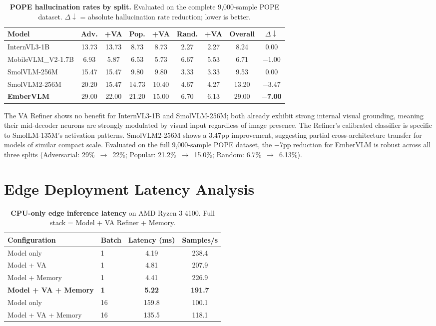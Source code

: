 \begin{table}[htbp]
\centering
\caption{\textbf{POPE hallucination rates by split.} Evaluated on the complete 9{,}000-sample POPE dataset. $\Delta\downarrow$ = absolute hallucination rate reduction; lower is better.}
\label{tab:pope_results}
\scriptsize
\setlength{\tabcolsep}{3pt}
\begin{tabular}{lcc|cc|cc|cc}
\toprule
\textbf{Model} & Adv. & +VA & Pop. & +VA & Rand. & +VA & Overall & $\Delta\downarrow$ \\
\midrule
InternVL3-1B       & 13.73 & 13.73 & 8.73  & 8.73  & 2.27 & 2.27 & 8.24  & 0.00 \\
MobileVLM\_V2-1.7B & 6.93  & 5.87  & 6.53  & 5.73  & 6.67 & 5.53 & 6.71  & $-$1.00 \\
SmolVLM-256M       & 15.47 & 15.47 & 9.80  & 9.80  & 3.33 & 3.33 & 9.53  & 0.00 \\
SmolVLM2-256M      & 20.20 & 15.47 & 14.73 & 10.40 & 4.67 & 4.27 & 13.20 & $-$3.47 \\
\textbf{EmberVLM}  & 29.00 & 22.00 & 21.20 & 15.00 & 6.70 & 6.13 & 29.00 & \textbf{$-$7.00} \\
\bottomrule
\end{tabular}
\end{table}

The VA Refiner shows no benefit for InternVL3-1B and SmolVLM-256M; both already exhibit strong internal visual grounding, meaning their mid-decoder neurons are strongly modulated by visual input regardless of image presence. The Refiner's calibrated classifier is specific to SmolLM-135M's activation patterns. SmolVLM2-256M shows a 3.47pp improvement, suggesting partial cross-architecture transfer for models of similar compact scale. Evaluated on the full 9{,}000-sample POPE dataset, the $-$7pp reduction for EmberVLM is robust across all three splits (Adversarial: 29\%~$\rightarrow$~22\%; Popular: 21.2\%~$\rightarrow$~15.0\%; Random: 6.7\%~$\rightarrow$~6.13\%).

\section{Edge Deployment Latency Analysis}
\label{sec:exp_latency}

\begin{table}[htbp]
\centering
\caption{\textbf{CPU-only edge inference latency} on AMD Ryzen 3 4100. Full stack = Model + VA Refiner + Memory.}
\label{tab:latency}
\begin{tabular}{llcc}
\toprule
\textbf{Configuration} & \textbf{Batch} & \textbf{Latency (ms)} & \textbf{Samples/s} \\
\midrule
Model only & 1 & 4.19 & 238.4 \\
Model + VA & 1 & 4.81 & 207.9 \\
Model + Memory & 1 & 4.41 & 226.9 \\
\textbf{Model + VA + Memory} & \textbf{1} & \textbf{5.22} & \textbf{191.7} \\
\midrule
Model only & 16 & 159.8 & 100.1 \\
Model + VA + Memory & 16 & 135.5 & 118.1 \\
\bottomrule
\end{tabular}
\end{table}

